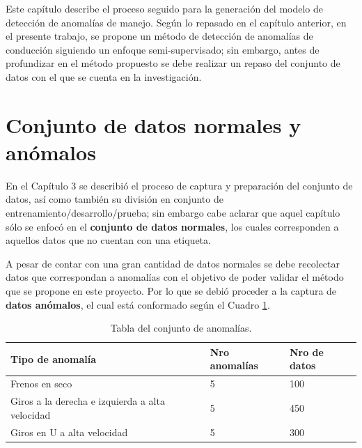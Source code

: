 Este cap\'{i}tulo describe el proceso seguido para la generaci\'{o}n del modelo de detecci\'{o}n de anomal\'{i}as de manejo. Seg\'{u}n lo repasado en el cap\'{i}tulo anterior, en el presente trabajo, se propone un m\'{e}todo de detecci\'{o}n de anomal\'{i}as de conducci\'{o}n siguiendo un enfoque semi-supervisado; sin embargo, antes de profundizar en el m\'{e}todo propuesto se debe realizar un repaso del conjunto de datos con el que se cuenta en la investigaci\'{o}n.

\section{Conjunto de datos normales y an\'{o}malos}

En el Cap\'{i}tulo 3 se describi\'{o} el proceso de captura y preparaci\'{o}n del conjunto de datos, as\'{i} como tambi\'{e}n su divisi\'{o}n en conjunto de entrenamiento/desarrollo/prueba; sin embargo cabe aclarar que aquel cap\'{i}tulo s\'{o}lo se enfoc\'{o} en el  \textbf{conjunto de datos normales}, los cuales corresponden a aquellos datos que no cuentan con una etiqueta.%

\vspace{5mm} %

A pesar de contar con una gran cantidad de datos normales se debe recolectar datos que correspondan a anomal\'{i}as con el objetivo de poder validar el m\'{e}todo que se propone en este proyecto. Por lo que se debi\'{o} proceder a la captura de  \textbf{datos an\'{o}malos}, el cual est\'{a} conformado seg\'{u}n el Cuadro \ref{table:conjunto_anomalias}.

\begin{table}[]
\centering
\begin{tabular}{|l|l|l|}
\hline
Tipo de anomal\'{i}a & Nro anomal\'{i}as & Nro de datos \\ \hline
Frenos en seco    & 5  & 100  \\ \hline
Giros a la derecha e izquierda a alta velocidad & 5  & 450  \\ \hline
Giros en U a alta velocidad & 5 & 300 \\ \hline
\end{tabular}
\caption{Tabla del conjunto de anomal\'{i}as.}
\label{table:conjunto_anomalias}
\end{table}

\vspace{5mm} %

